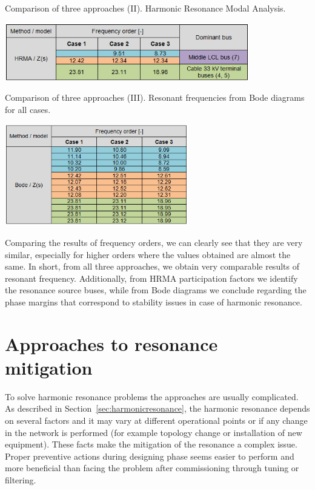 \documentclass[a4paper,11pt,oneside]{report} %
\begin{document}
\begin{table}[htb]
	\centering
	\caption{Comparison of three approaches (II). Harmonic Resonance Modal Analysis.}
	\includegraphics[width=0.8\textwidth]{img/Case123/stability_comparison_table_hrma.png}
  	\label{tab:stability_comparison_table_hrma}
\end{table}
\FloatBarrier

\begin{table}[htb]
	\centering
	\caption{Comparison of three approaches (III). Resonant frequencies from Bode diagrams for all cases.}
	\includegraphics[width=0.6\textwidth]{img/Case123/stability_comparison_table_bode1.png}
  	\label{tab:stability_comparison_table_bode1}
\end{table}
\FloatBarrier

Comparing the results of frequency orders, we can clearly see that they are very similar, especially for higher orders where the values obtained are almost the same. In short, from all three approaches, we obtain very comparable results of resonant frequency. Additionally, from HRMA participation factors we identify the resonance source buses, while from Bode diagrams we conclude regarding the phase margins that correspond to stability issues in case of harmonic resonance.

\chapter{Approaches to resonance mitigation} \label{sec:mitigation}
To solve harmonic resonance problems the approaches are usually complicated. As described in Section~\ref{sec:harmonicresonance}, the harmonic resonance depends on several factors and it may vary at different operational points or if any change in the network is performed (for example topology change or installation of new equipment). These facts make the mitigation of the resonance a complex issue. Proper preventive actions during designing phase seems easier to perform and more beneficial than facing the problem after commissioning through tuning or filtering.
\end{document}
